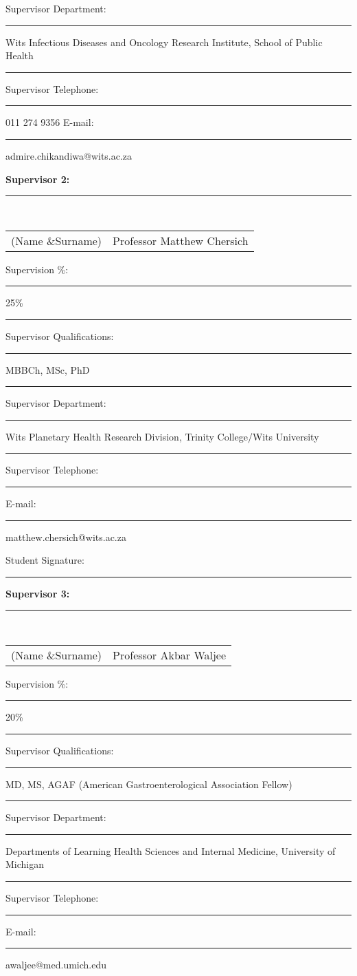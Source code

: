\documentclass[12pt,a4paper]{article}
\begin{document}
\vspace{0.3cm}
Supervisor Department: \rule{12cm}{0.4pt} Wits Infectious Diseases and Oncology Research Institute, School of Public Health \rule{12cm}{0.4pt}

\vspace{0.3cm}
Supervisor Telephone: \rule{8cm}{0.4pt} 011 274 9356 E-mail: \rule{8cm}{0.4pt} admire.chikandiwa@wits.ac.za

\vspace{1cm}
\textbf{Supervisor 2:} \rule{12cm}{0.4pt} \\
\begin{tabular}{ll}
(Name \&Surname) & Professor Matthew Chersich \\
\end{tabular}

\vspace{0.3cm}
Supervision \%: \rule{3cm}{0.4pt} 25\% \rule{10cm}{0.4pt}

\vspace{0.3cm}
Supervisor Qualifications: \rule{12cm}{0.4pt} MBBCh, MSc, PhD \rule{12cm}{0.4pt}

\vspace{0.3cm}
Supervisor Department: \rule{12cm}{0.4pt} Wits Planetary Health Research Division, Trinity College/Wits University \rule{12cm}{0.4pt}

\vspace{0.3cm}
Supervisor Telephone: \rule{8cm}{0.4pt} E-mail: \rule{8cm}{0.4pt} matthew.chersich@wits.ac.za

\vspace{0.3cm}
Student Signature: \rule{12cm}{0.4pt}

\vspace{1cm}
\textbf{Supervisor 3:} \rule{12cm}{0.4pt} \\
\begin{tabular}{ll}
(Name \&Surname) & Professor Akbar Waljee \\
\end{tabular}

\vspace{0.3cm}
Supervision \%: \rule{3cm}{0.4pt} 20\% \rule{10cm}{0.4pt}

\vspace{0.3cm}
Supervisor Qualifications: \rule{12cm}{0.4pt} MD, MS, AGAF (American Gastroenterological Association Fellow) \rule{12cm}{0.4pt}

\vspace{0.3cm}
Supervisor Department: \rule{12cm}{0.4pt} Departments of Learning Health Sciences and Internal Medicine, University of Michigan \rule{12cm}{0.4pt}

\vspace{0.3cm}
Supervisor Telephone: \rule{8cm}{0.4pt} E-mail: \rule{8cm}{0.4pt} awaljee@med.umich.edu
\end{document}
